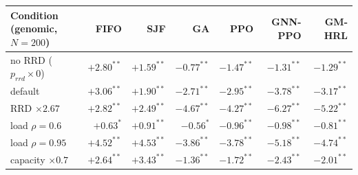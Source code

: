 \begin{tabular}{lrrrrrr}
\toprule
Condition (genomic, $N=200$) & FIFO & SJF & GA & PPO & GNN-PPO & GM-HRL \\
\midrule
no RRD ($p_{rrd}\times 0$) & $+2.80^{**}$ & $+1.59^{**}$ & $-0.77^{**}$ & $-1.47^{**}$ & $-1.31^{**}$ & $-1.29^{**}$ \\
default & $+3.06^{**}$ & $+1.90^{**}$ & $-2.71^{**}$ & $-2.95^{**}$ & $-3.78^{**}$ & $-3.17^{**}$ \\
RRD $\times 2.67$ & $+2.82^{**}$ & $+2.49^{**}$ & $-4.67^{**}$ & $-4.27^{**}$ & $-6.27^{**}$ & $-5.22^{**}$ \\
load $\rho=0.6$ & $+0.63^{*}$ & $+0.91^{**}$ & $-0.56^{*}$ & $-0.96^{**}$ & $-0.98^{**}$ & $-0.81^{**}$ \\
load $\rho=0.95$ & $+4.52^{**}$ & $+4.53^{**}$ & $-3.86^{**}$ & $-3.78^{**}$ & $-5.18^{**}$ & $-4.74^{**}$ \\
capacity $\times 0.7$ & $+2.64^{**}$ & $+3.43^{**}$ & $-1.36^{**}$ & $-1.72^{**}$ & $-2.43^{**}$ & $-2.01^{**}$ \\
\bottomrule
\end{tabular}
